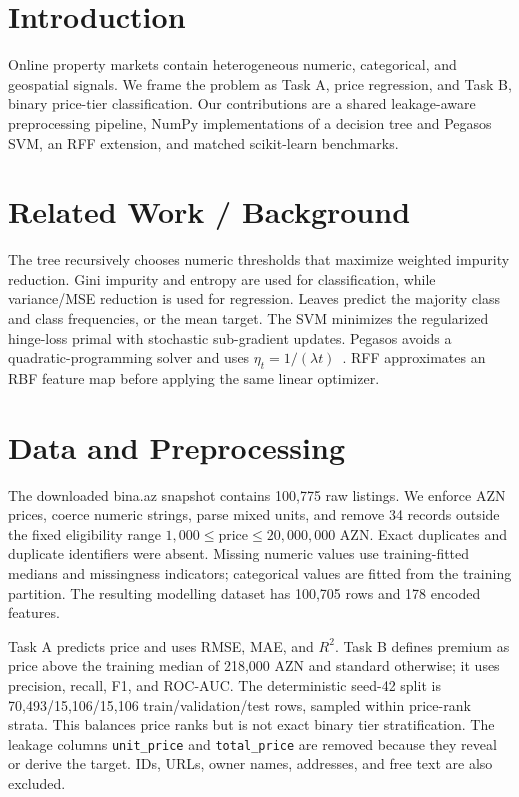 \documentclass[10pt,twocolumn,a4paper]{article}
\begin{document}
\section{Introduction}
Online property markets contain heterogeneous numeric, categorical, and
geospatial signals. We frame the problem as Task A, price regression, and
Task B, binary price-tier classification. Our contributions are a shared
leakage-aware preprocessing pipeline, NumPy implementations of a decision
tree and Pegasos SVM, an RFF extension, and matched scikit-learn benchmarks.

\section{Related Work / Background}
The tree recursively chooses numeric thresholds that maximize weighted
impurity reduction. Gini impurity and entropy are used for classification,
while variance/MSE reduction is used for regression. Leaves predict the
majority class and class frequencies, or the mean target. The SVM minimizes
the regularized hinge-loss primal with stochastic sub-gradient updates.
Pegasos avoids a quadratic-programming solver and uses
$\eta_t=1/(\lambda t)$~\cite{pegasos}. RFF approximates an RBF feature map
before applying the same linear optimizer.

\section{Data and Preprocessing}
The downloaded bina.az snapshot contains 100,775 raw listings. We enforce
AZN prices, coerce numeric strings, parse mixed units, and remove 34
records outside the fixed eligibility range
$1{,}000\leq\text{price}\leq20{,}000{,}000$ AZN. Exact duplicates and
duplicate identifiers were absent. Missing numeric values use
training-fitted medians and missingness indicators; categorical values are
fitted from the training partition. The resulting modelling dataset has
100,705 rows and 178 encoded features.

Task A predicts price and uses RMSE, MAE, and $R^2$. Task B defines
premium as price above the training median of 218,000 AZN and standard
otherwise; it uses precision, recall, F1, and ROC-AUC. The deterministic
seed-42 split is 70,493/15,106/15,106 train/validation/test rows, sampled
within price-rank strata. This balances price ranks but is not exact binary
tier stratification. The leakage columns \texttt{unit\_price} and
\texttt{total\_price} are removed because they reveal or derive the target.
IDs, URLs, owner names, addresses, and free text are also excluded.
\end{document}
